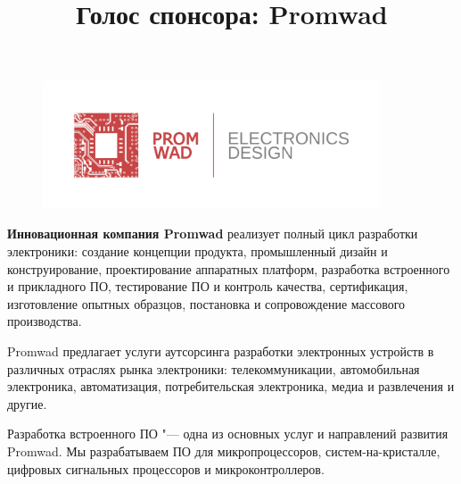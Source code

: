 \documentclass[10pt, a5paper]{article}
\begin{document}
\title{Голос спонсора: Promwad}
\date{}
\maketitle

\begin{figure}[h!]
\centering
\includegraphics[width=10cm]{53_spons_promwad.png}
\end{figure}

{\bf Инновационная компания Promwad} реализует полный цикл разработки электроники: создание концепции продукта, промышленный дизайн и конструирование, проектирование аппаратных \linebreak платформ, разработка встроенного и прикладного ПО, тестирование ПО и контроль качества, сертификация, изготовление опытных образцов, постановка и сопровождение массового производства.

Promwad предлагает услуги аутсорсинга разработки электронных устройств в различных отраслях рынка электроники: телекоммуникации, автомобильная электроника, автоматизация, потребительская электроника, медиа и развлечения и другие. 

Разработка встроенного ПО "--- одна из основных услуг и направлений развития Promwad. Мы разрабатываем ПО для микропроцессоров, систем-на-кристалле, цифровых сигнальных процессоров и микроконтроллеров.
\end{document}

